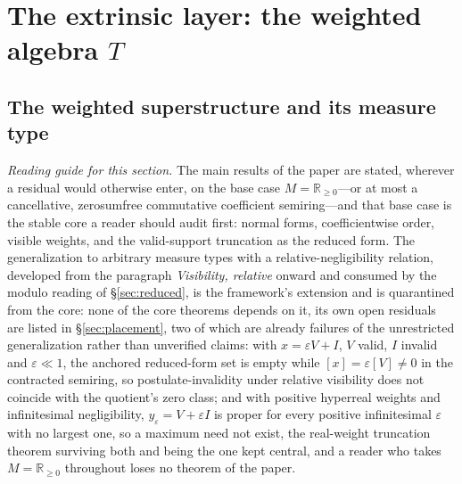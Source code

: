 \section{The extrinsic layer: the weighted algebra $T$}
\label{sec:extrinsic}

\subsection{The weighted superstructure and its measure type}
\noindent\textit{Reading guide for this section.} The main results of the paper are stated, wherever a residual would otherwise enter, on the base case $M = \mathbb{R}_{\ge 0}$---or at most a cancellative, zerosumfree commutative coefficient semiring---and that base case is the stable core a reader should audit first: normal forms, coefficientwise order, visible weights, and the valid-support truncation as the reduced form. The generalization to arbitrary measure types with a relative-negligibility relation, developed from the paragraph \emph{Visibility, relative} onward and consumed by the modulo reading of §\ref{sec:reduced}, is the framework's extension and is quarantined from the core: none of the core theorems depends on it, its own open residuals are listed in §\ref{sec:placement}, two of which are already failures of the unrestricted generalization rather than unverified claims: with $x = \varepsilon V + I$, $V$ valid, $I$ invalid and $\varepsilon \ll 1$, the anchored reduced-form set is empty while $[x] = \varepsilon [V] \ne 0$ in the contracted semiring, so postulate-invalidity under relative visibility does not coincide with the quotient's zero class; and with positive hyperreal weights and infinitesimal negligibility, $y_\varepsilon = V + \varepsilon I$ is proper for every positive infinitesimal $\varepsilon$ with no largest one, so a maximum need not exist, the real-weight truncation theorem surviving both and being the one kept central, and a reader who takes $M = \mathbb{R}_{\ge 0}$ throughout loses no theorem of the paper.


